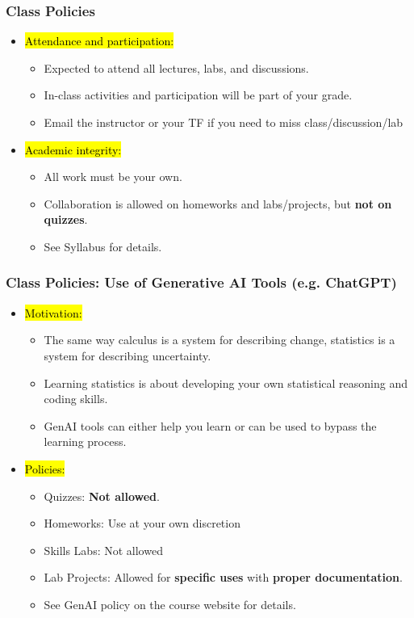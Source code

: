 \documentclass[11pt,containsverbatim,handout]{beamer}
\begin{document}

\begin{frame}
	\frametitle{Class Policies} 
	\begin{itemize}
		\item \hl{Attendance and participation:} 
		\begin{itemize}
			\item Expected to attend all lectures, labs, and discussions. 
			\item In-class activities and participation will be part of your grade.
			\item Email the instructor or your TF if you need to miss class/discussion/lab
		\end{itemize}
		\item \hl{Academic integrity:} 
		\begin{itemize}
			\item All work must be your own. 
			\item Collaboration is allowed on homeworks and labs/projects, but \textbf{not on quizzes}. 
			\item See Syllabus for details.
		\end{itemize}
	\end{itemize}
\end{frame}
\begin{frame}
	\frametitle{Class Policies: Use of Generative AI Tools (e.g. ChatGPT)} 
	\begin{itemize}
		\item \hl{Motivation:}
		\begin{itemize}
			\item The same way calculus is a system for describing change, statistics is a system for describing uncertainty.
			\item Learning statistics is about developing your own statistical reasoning and coding skills.
			\item GenAI tools can either help you learn or can be used to bypass the learning process.
		\end{itemize}
		\item \hl{Policies:}
		\begin{itemize}
			\item Quizzes: \textbf{Not allowed}.
			\item Homeworks: Use at your own discretion
			\item Skills Labs: Not allowed
			\item Lab Projects: Allowed for \textbf{specific uses} with \textbf{proper documentation}.
			\item See GenAI policy on the course website for details.
		\end{itemize}
	\end{itemize}
\end{frame}
\end{document}
